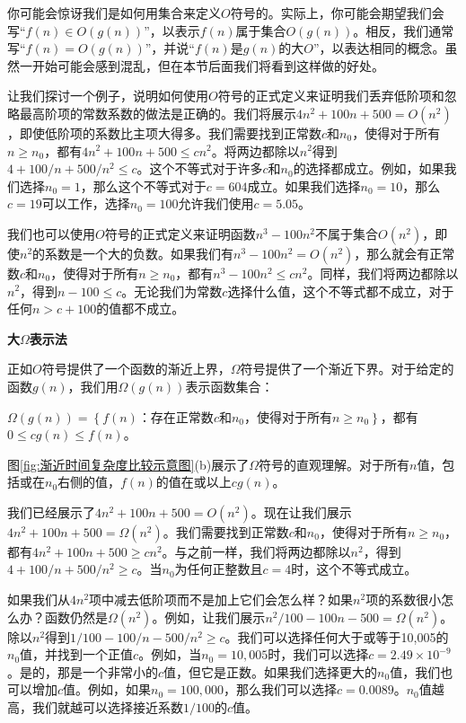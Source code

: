 \documentclass[lang=cn,newtx,10pt,scheme=chinese]{elegantbook}
\begin{document}
你可能会惊讶我们是如何用集合来定义$O$符号的。实际上，你可能会期望我们会写“$f(n) \in O(g(n))$”，以表示$f(n)$属于集合$O(g(n))$。相反，我们通常写“$f(n)=O(g(n))$”，并说``$f(n)$是$g(n)$的大$O$''，以表达相同的概念。虽然一开始可能会感到混乱，但在本节后面我们将看到这样做的好处。

让我们探讨一个例子，说明如何使用$O$符号的正式定义来证明我们丢弃低阶项和忽略最高阶项的常数系数的做法是正确的。我们将展示$4 n^2+100 n+500=O\left(n^2\right)$，即使低阶项的系数比主项大得多。我们需要找到正常数$c$和$n_0$，使得对于所有$n \geq n_0$，都有$4 n^2+100 n+500 \leq c n^2$。将两边都除以$n^2$得到$4+100 / n+500 / n^2 \leq c$。这个不等式对于许多$c$和$n_0$的选择都成立。例如，如果我们选择$n_0=1$，那么这个不等式对于$c=604$成立。如果我们选择$n_0=10$，那么$c=19$可以工作，选择$n_0=100$允许我们使用$c=5.05$。

我们也可以使用$O$符号的正式定义来证明函数$n^3-100 n^2$不属于集合$O\left(n^2\right)$，即使$n^2$的系数是一个大的负数。如果我们有$n^3-100 n^2=O\left(n^2\right)$，那么就会有正常数$c$和$n_0$，使得对于所有$n \geq n_0$，都有$n^3-100 n^2 \leq c n^2$。同样，我们将两边都除以$n^2$，得到$n-100 \leq c$。无论我们为常数$c$选择什么值，这个不等式都不成立，对于任何$n>c+100$的值都不成立。

\textbf{大$\Omega$表示法}

正如$O$符号提供了一个函数的渐近上界，$\Omega$符号提供了一个渐近下界。对于给定的函数$g(n)$，我们用$\Omega(g(n))$表示函数集合：

$\Omega(g(n))=\left\{f(n)\right.$：存在正常数$c$和$n_0$，使得对于所有$\left.n \geq n_0\right\}$，都有$0 \leq c g(n) \leq f(n)$。

图\ref{fig:渐近时间复杂度比较示意图}(b)展示了$\Omega$符号的直观理解。对于所有$n$值，包括或在$n_0$右侧的值，$f(n)$的值在或以上$c g(n)$。

我们已经展示了$4 n^2+100 n+500=O\left(n^2\right)$。现在让我们展示$4 n^2+100 n+500=\Omega\left(n^2\right)$。我们需要找到正常数$c$和$n_0$，使得对于所有$n \geq n_0$，都有$4 n^2+100 n+500 \geq c n^2$。与之前一样，我们将两边都除以$n^2$，得到$4+100 / n+500 / n^2 \geq c$。当$n_0$为任何正整数且$c=4$时，这个不等式成立。

如果我们从$4n^2$项中减去低阶项而不是加上它们会怎么样？如果$n^2$项的系数很小怎么办？函数仍然是$\Omega\left(n^2\right)$。例如，让我们展示$n^2 / 100-100 n-500=\Omega\left(n^2\right)$。除以$n^2$得到$1 / 100-100 / n-500 / n^2 \geq c$。我们可以选择任何大于或等于10,005的$n_0$值，并找到一个正值$c$。例如，当$n_0=10,005$时，我们可以选择$c=2.49 \times 10^{-9}$。是的，那是一个非常小的$c$值，但它是正数。如果我们选择更大的$n_0$值，我们也可以增加$c$值。例如，如果$n_0=100,000$，那么我们可以选择$c=0.0089$。$n_0$值越高，我们就越可以选择接近系数$1 / 100$的$c$值。
\end{document}
